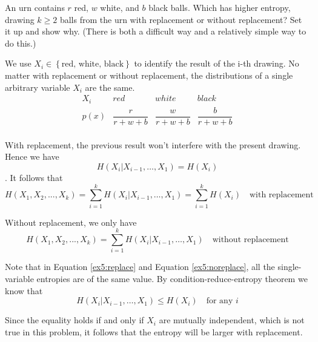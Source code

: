 \begin{exercise}{An urn contains $r$ red, $w$ white, and $b$ black balls. Which has higher entropy, drawing $k \ge 2$ balls from the urn with replacement or without replacement? Set it up and show why. (There is both a difficult way and a relatively simple way to do this.)}
  \begin{solution}
    We use $X_i \in \left\{ \text{red, white, black} \right\}$ to identify the result of the i-th drawing. No matter with replacement or without replacement, the distributions of a single arbitrary variable $X_i$ are the same.
    \begin{equation}
      \begin{array}{cccc}
        X_i & red & white & black \\
        p(x) & \dfrac{r}{r+w+b} & \dfrac{w}{r+w+b} & \dfrac{b}{r+w+b} \\
      \end{array}
    \end{equation}

    With replacement, the previous result won't interfere with the present drawing. Hence we have $$H\left(X_{i} | X_{i-1}, \ldots, X_{1}\right)=H\left(X_{i}\right)$$. It follows that
    \begin{equation}
      H(X_1,X_2,...,X_k)  = \sum_{i=1}^{k}  H\left(X_{i} | X_{i-1}, \ldots, X_{1}\right) = \sum_{i=1}^{k}H\left(X_{i}\right) \quad \text{with replacement}
      \label{ex5:replace}
    \end{equation}

    Without replacement, we only have
    \begin{equation}
      H(X_1,X_2,...,X_k) = \sum_{i=1}^{k}  H\left(X_{i} | X_{i-1}, \ldots, X_{1}\right) \quad \text{without replacement}
      \label{ex5:noreplace}
    \end{equation}

    Note that in Equation \ref{ex5:replace} and Equation \ref{ex5:noreplace}, all the single-variable entropies are of the same value. By condition-reduce-entropy theorem we know that
    $$H\left(X_{i} | X_{i-1}, \ldots, X_{1}\right) \le H(X_i) \quad \text{for any } i $$

    Since the equality holds if and only if $X_i$ are mutually independent, which is not true in this problem, it follows that the entropy will be larger with replacement.
  \end{solution}
\end{exercise}

